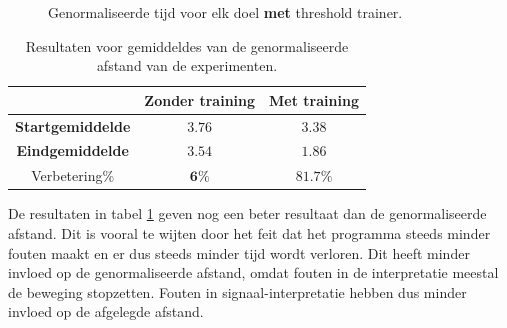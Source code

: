 \documentclass{article}
\newcommand{\figwidth}{0.85\linewidth}
\begin{document}
\begin{figure}[H]
	\centering
	\caption{Genormaliseerde tijd voor elk doel \textbf{met} threshold trainer.}
	\label{fig:restimewt}
	
\end{figure}

\begin{table}[H]
	\begin{tabular}{|c|c|c|}
		\hline  & \textbf{Zonder training} & \textbf{Met training} \\ 
		\hline \textbf{Startgemiddelde} & $3.76$ & $3.38$ \\ 
		\hline \textbf{Eindgemiddelde} & $3.54$ & $1.86$ \\ 
		\hline Verbetering\% & $\mathbf{6}\%$ & $\mathbf{81.7}\%$\\
		\hline
	\end{tabular} 
	\caption{Resultaten voor gemiddeldes van de genormaliseerde afstand van de experimenten.}
	\label{tbl:resgemiddeldestijd}
\end{table}
De resultaten in tabel \ref{tbl:resgemiddeldestijd} geven nog een beter resultaat dan de genormaliseerde afstand. Dit is vooral te wijten door het feit dat het programma steeds minder fouten maakt en er dus steeds minder tijd wordt verloren. Dit heeft minder invloed op de genormaliseerde afstand, omdat fouten in de interpretatie meestal de beweging stopzetten. Fouten in signaal-interpretatie hebben dus minder invloed op de afgelegde afstand.\\
\end{document}
